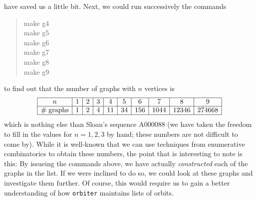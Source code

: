 have saved us a little bit. 
Next, we could run successively the commands
\begin{quote}
make g4\\
make g5\\
make g6\\
make g7\\
make g8\\
make g9\\
\end{quote}
to find out that the number of graphs with $n$ vertices is 
$$
\begin{array}{|c|*{9}{c|}}
\hline
n & 1 & 2 & 3 & 4 & 5 & 6 & 7 & 8 & 9  \\
\hline
\# \; \mbox{graphs} & 1 & 2 & 4 & 11 & 34 & 156 & 1044 & 12346 & 274668 \\
\hline
\end{array}
$$
which is nothing else than Sloan's sequence A000088 
(we have taken the freedom to fill in the values for $n=1,2,3$ by hand; these numbers are not difficult to come by). 
While it is well-known that we can use techniques from enumerative combinatorics 
to obtain these numbers, the point that is interesting to note is this: 
By issueing the commands above, we 
have actually {\em constructed} each of the graphs in the list.
If we were inclined to do so, we could look at these graphs and 
investigate them further. Of course, this would require us to 
gain a better understanding of how \verb'orbiter' maintains lists of orbits.

\bigskip

